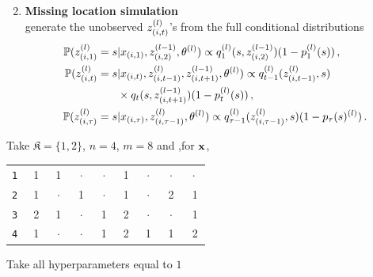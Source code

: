 \begin{slide}
\begin{block}\small
\begin{enumerate}
\setcounter{enumi}{1}
\item {{\bfseries Missing location simulation}}\\
generate the unobserved $z_{(i,t)}^{(l)}$'s from the full conditional distributions
\footnotesize
\begin{align*}
\mathbb{P}(z_{(i,1)}^{(l)}=s&|x_{(i,1)},z_{(i,2)}^{(l-1)},\theta^{(l)})
\propto q_1^{(l)}(s,z_{(i,2)}^{(l-1)})(1-p_1^{(l)}(s))\,,\\
%
\mathbb{P}(\zs^{(l)}=s&|x_{(i,t)},z_{(i,t-1)}^{(l)},z_{(i,t+1)}^{(l-1)},\theta^{(l)})
\propto q_{t-1}^{(l)}(z_{(i,t-1)}^{(l)},s)\\
&\times q_{t}(s,z_{(i,t+1)}^{(l-1)})(1-p_t^{(l)}(s))\,,\\
%
\mathbb{P}(z_{(i,\tau)}^{(l)}=s&|x_{(i,\tau)},z_{(i,\tau-1)}^{(l)},\theta^{(l)})
\propto q_{\tau-1}^{(l)}(z_{(i,\tau-1)}^{(l)},s)(1-p_\tau(s)^{(l)})\,.
\end{align*}
\end{enumerate}
\normalsize\end{block}
\end{slide}\begin{slide}

Take $\mathfrak{K}=\{1,2\}$, $n=4$, $m=8$ and ,for $\mathbf{x}$,\\
\small\begin{center}
\begin{tabular}{r|cccccccc}
{\tt 1}$\ $&$\ $1$\ $&$\ $1$\   $&$\ \cdot\ $&$\ \cdot\ $&$\ $1$\ $&$\ \cdot\ $&$\ \cdot\ $&$\ \cdot\ $\\
{\tt 2}$\ $&$\ $1$\ $&$\ \cdot\ $&$\ $1$\   $&$\ \cdot\ $&$\ $1$\ $&$\ \cdot\ $&$\ $2$\   $&$\ $1\\
{\tt 3}$\ $&$\ $2$\ $&$\ $1$\   $&$\ \cdot\ $&$\ $1$\   $&$\ $2$\ $&$\ \cdot\ $&$\ \cdot\ $&$\ $1\\
{\tt 4}$\ $&$\ $1$\ $&$\ \cdot\ $&$\ \cdot\ $&$\ $1$\   $&$\ $2$\ $&$\ $1$\   $&$\ $1$\   $&$\ $2\\
\end{tabular}
\end{center}\normalsize

\vs
Take all hyperparameters equal to $1$

\end{slide}\begin{slide}


\end{slide}
